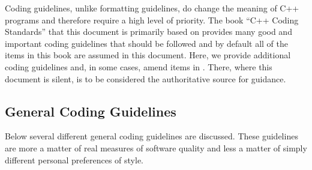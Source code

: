 Coding guidelines, unlike formatting guidelines, do change the meaning of C++
programs and therefore require a high level of priority.  The book ``C++
Coding Standards'' {}\cite{C++CodingStandards05} that this document is
primarily based on provides many good and important coding guidelines that
should be followed and by default all of the items in this book are assumed in
this document.  Here, we provide additional coding guidelines and, in some
cases, amend items in {}\cite{C++CodingStandards05}.  There, where this
document is silent, {}\cite{C++CodingStandards05} is to be considered the
authoritative source for guidance.

%
\subsection{General Coding Guidelines}
%

Below several different general coding guidelines are discussed.  These
guidelines are more a matter of real measures of software quality and less a
matter of simply different personal preferences of style.

